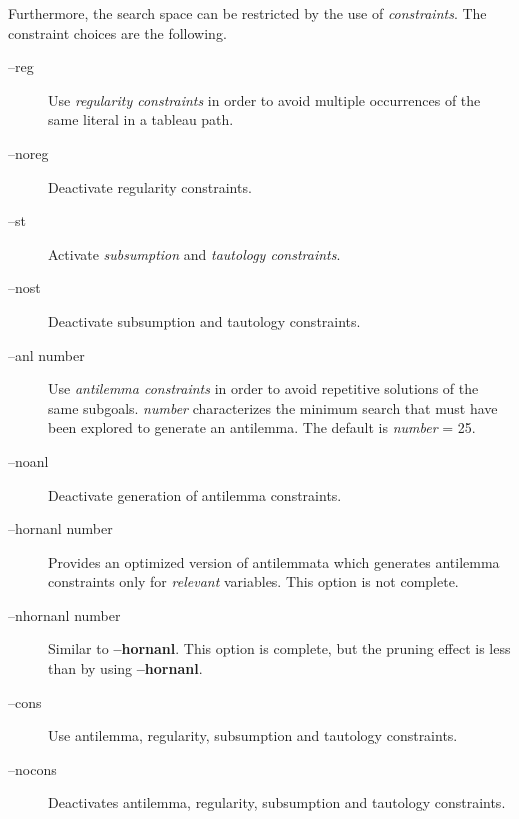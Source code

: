 Furthermore, the search space can be restricted by the use of
{\it constraints\/}. The constraint choices are the following.
\begin{description}
      \item[--reg] 
           {Use {\it regularity constraints\/} in order to  avoid  multiple
            occurrences of the same literal in a tableau path.}
      \item[--noreg] 
           {Deactivate regularity constraints.}
      \item[--st] 
           {Activate {\it subsumption\/} and {\it tautology constraints\/}.}
      \item[--nost] 
           {Deactivate subsumption and tautology constraints.}
      \item[--anl \lb number\rb] 
           {Use {\it antilemma constraints\/} in order to  avoid  repetitive
            solutions of the same subgoals. {\it number\/} characterizes
            the minimum search that must have been explored to generate an
            antilemma. The default is {\it number\/} = 25.}
      \item[--noanl] 
           {Deactivate generation of antilemma constraints.}
      \item[--hornanl \lb number\rb] 
           {Provides an optimized version of antilemmata which
            generates antilemma constraints only for {\it relevant\/}
            variables. This option is not complete.}
      \item[--nhornanl \lb number\rb] 
           {Similar to {\bf --hornanl}. This option is complete, but
            the pruning effect is less than by using {\bf --hornanl}.} 
      \item[--cons] 
           {Use antilemma, regularity, subsumption and tautology
            constraints.} 
      \item[--nocons] 
           {Deactivates antilemma, regularity, subsumption and
            tautology constraints.} 
\end{description}

